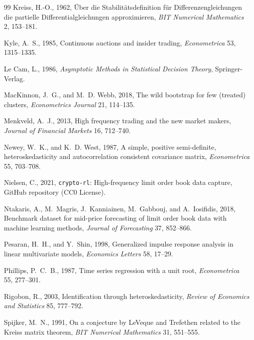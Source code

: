 \documentclass[12pt]{article}
\theoremstyle{definition}
\theoremstyle{remark}
\begin{document}
\begin{thebibliography}{99}
Kreiss, H.-O., 1962, {\"U}ber die Stabilit{\"a}tsdefinition f{\"u}r Differenzengleichungen die partielle Differentialgleichungen approximieren, \emph{BIT Numerical Mathematics} 2, 153--181.

Kyle, A.~S., 1985, Continuous auctions and insider trading, \emph{Econometrica} 53, 1315--1335.

Le Cam, L., 1986, \emph{Asymptotic Methods in Statistical Decision Theory}, Springer-Verlag.

MacKinnon, J.~G., and M.~D. Webb, 2018, The wild bootstrap for few (treated) clusters, \emph{Econometrics Journal} 21, 114--135.

Menkveld, A.~J., 2013, High frequency trading and the new market makers, \emph{Journal of Financial Markets} 16, 712--740.

Newey, W.~K., and K.~D. West, 1987, A simple, positive semi-definite, heteroskedasticity and autocorrelation consistent covariance matrix, \emph{Econometrica} 55, 703--708.

Nielsen, C., 2021, \texttt{crypto-rl}: High-frequency limit order book data capture, GitHub repository (CC0 License).

Ntakaris, A., M.~Magris, J.~Kanniainen, M.~Gabbouj, and A.~Iosifidis, 2018, Benchmark dataset for mid-price forecasting of limit order book data with machine learning methods, \emph{Journal of Forecasting} 37, 852--866.

Pesaran, H.~H., and Y.~Shin, 1998, Generalized impulse response analysis in linear multivariate models, \emph{Economics Letters} 58, 17--29.

Phillips, P.~C.~B., 1987, Time series regression with a unit root, \emph{Econometrica} 55, 277--301.

Rigobon, R., 2003, Identification through heteroskedasticity, \emph{Review of Economics and Statistics} 85, 777--792.

Spijker, M.~N., 1991, On a conjecture by LeVeque and Trefethen related to the Kreiss matrix theorem, \emph{BIT Numerical Mathematics} 31, 551--555.


\end{thebibliography}
\end{document}
